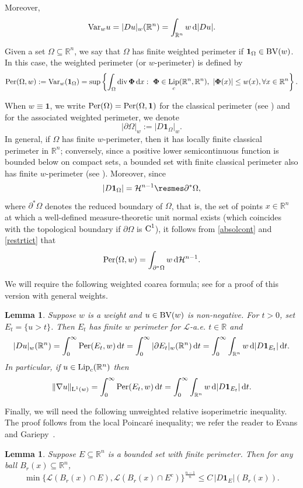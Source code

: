 \documentclass[11pt, a4paper, reqno]{amsart}
\newcommand{\R}{\mathbb R}
\newcommand{\dx}{\,{\mathrm dx}}
\newcommand{\Lup}{\textup{L}}
\newcommand{\Leb}{\mathcal{L}}
\newcommand{\BV}{\textup{BV}}
\newcommand{\Con}{\textup{C}}
\DeclareMathOperator{\Lip}{\textup{Lip}}
\DeclareMathOperator{\Div}{\textup{div}}
\DeclareMathOperator{\Per}{\textup{Per}}
\newtheorem{lemma}[theorem]{Lemma}
\theoremstyle{definition}
\theoremstyle{remark}
\begin{document}
Moreover,
\[
\textup{Var}_w u=|Du|_w(\R^n)
=\int_{\R^n} w\,\mathrm d|Du|.
\]

Given a set $\Omega \subseteq \R^n$, we say that $\Omega$ has finite weighted perimeter if $\mathbf{1}_\Omega \in \BV(w)$.  
In this case, the weighted perimeter (or $w$-perimeter) is defined by
\[
\Per(\Omega,w)
:= \textup{Var}_w(\mathbf{1}_\Omega)
= \sup\left\{
\int_{\Omega} \Div \boldsymbol{\Phi}\dx
:\ \boldsymbol{\Phi} \in \Lip_c(\R^n,\R^n),\ |\boldsymbol{\Phi}(x)| \le w(x), \forall x\in \R^n
\right\}.
\]

When $w \equiv \mathbf 1$, we write $\Per(\Omega)=\Per(\Omega,\mathbf 1)$ for the classical perimeter (see \cite{EG}) and for the associated weighted perimeter, we denote  
\[
|\partial \Omega|_w := |D\mathbf 1_\Omega|_w.
\] 
In general, if $\Omega$ has finite $w$-perimeter, then it has locally finite classical perimeter in $\R^n$; conversely, since a positive lower semicontinuous function is bounded below on compact sets, a bounded set with finite classical perimeter also has finite $w$-perimeter (see \cite{BGKM}). Moreover, since 
\begin{equation}\label{restrtict}
|D\mathbf 1_\Omega| = \mathcal H^{n-1} \resmes \partial^* \Omega,
\end{equation}
where $\partial^*\Omega$ denotes the reduced boundary of $\Omega$, that is, the set of points $x \in \R^n$ at which a well-defined measure-theoretic unit normal exists (which coincides with the topological boundary if $\partial \Omega$ is $\Con^1$), it follows from \eqref{absolcont} and \eqref{restrtict} that
\[
\Per(\Omega,w) = \int_{\partial^*\Omega} w \,\mathrm d\mathcal H^{n-1}.
\]



We will require the following weighted coarea formula; see \cite{Cam} for a proof of this version with general weights.
\begin{lemma}\label{coarea}
Suppose $w$ is a weight and $u\in \BV(w)$ is non-negative. For $t>0$, set $E_t=\{u>t\}$. Then $E_t$ has finite $w$ perimeter for $\Leb$-a.e. $t\in \R$ and
\[
|Du|_w(\R^n)
=\int_0^\infty \Per(E_t,w)\,\mathrm dt
=\int_0^\infty |\partial E_t|_w(\R^n)\,\mathrm dt
=\int_0^\infty \int_{\R^n} w\,\mathrm d|D\mathbf 1_{E_t}|\,\mathrm dt.
\]
In particular, if $u\in \Lip_c(\R^n)$ then
$$\|\nabla u\|_{\Lup^1(w)}=\int_0^\infty\Per(E_t,w)\,\mathrm dt=\int_0^\infty \int_{\R^n} w\,\mathrm d|D\mathbf 1_{E_t}|\,\mathrm dt.$$
\end{lemma}

Finally, we will need the following unweighted relative isoperimetric inequality. The proof follows from the local Poincar\'e inequality; we refer the reader to Evans and Gariepy~\cite[p.~190]{EG}.
\begin{lemma}\label{lowerbdiso}
Suppose $E\subseteq \R^n$ is a bounded set with finite perimeter. Then for any ball $B_r(x)\subseteq \R^n$,
\begin{equation}\label{iso}
\min\{\mathcal L(B_r(x)\cap E),\mathcal L(B_r(x)\cap E^c)\}^{\frac{n-1}{n}}
\le C\,|D\mathbf 1_E|(B_r(x)).
\end{equation}
\end{lemma}
\end{document}
